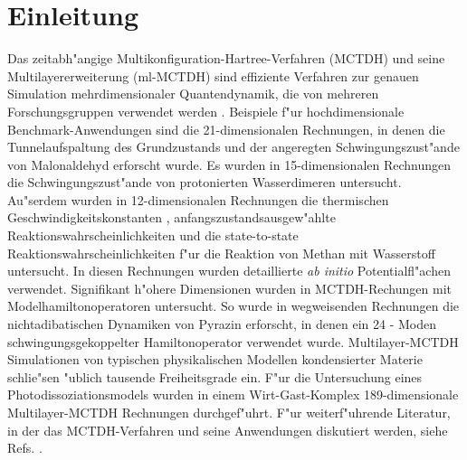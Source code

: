 \chapter{Einleitung}
\label{ch:einleitung}

Das zeitabh"angige Multikonfiguration-Hartree-Verfahren (MCTDH) 
\cite{MMC, MMC1} und seine Multilayererweiterung (ml-MCTDH)
\cite{WT3, Mreview2} 
sind effiziente Verfahren zur genauen Simulation mehrdimensionaler Quantendynamik,
die von mehreren Forschungsgruppen verwendet werden 
\cite{MCTDHex1, WestPNM, MCTDHex2, W1, MCTDHex4, MCTDHex5, MCTDHex6, MCTDHex7, MCTDHex8,
MCTDHex9, MCTDHex10, MCTDHex11, MCTDHex12, MCTDHex13, MCTDHex14, MCTDHex15, MCTDHex16, MCTDHex17,MCTDHex18}. 
Beispiele f"ur hochdimensionale 
Benchmark-Anwendungen sind die 21-dimen\-sio\-nalen Rechnungen, in denen die Tunnelaufspaltung des
Grundzustands \cite{CVM, HCVM, HaM1, MAMCTDH, HaM2, MAMCTDH2} und der angeregten \cite{HCVM, HaM1, MAMCTDH, HaM2, MAMCTDH2}
Schwingungszust"ande von Malonaldehyd erforscht wurde. 
Es wurden in 15-dimen\-sio\-nalen Rechnungen die Schwingungszust"ande von protonierten 
Wasserdi\-meren  \cite{H5O2+MCTDH, H5O2+MCTDH2, H5O2+MCTDH3, H5O2+MCTDH4, H5O2+MCTDH5} untersucht. 
Au"serdem wurden in 12-dimensionalen Rechnungen die thermischen 
Geschwindig\-keitskonstanten \cite{HM1, HM2, WWM, SM, vHNM,NvHM}, anfangszustandsausgew"ahlte Reaktionswahr\-scheinlichkeiten
\cite{SM02, SM04, WeM5, WeM6, WeM8} und die 
state-to-state Reaktionswahrscheinlichkeiten \cite{WeM7} f"ur die Reaktion von Methan mit Wasserstoff 
untersucht. In diesen Rechnungen wurden detaillierte \textit{ab initio} 
Potentialfl"achen verwendet. Signifikant h"ohere Dimensionen wurden in MCTDH-Rechungen mit 
Modelhamiltonoperatoren untersucht. So wurde in wegweisenden Rechnungen  
die nichtadibatischen Dynamiken von Pyrazin erforscht, in denen ein 24 - Moden 
schwingungsgekoppelter Hamiltonoperator \cite{WMC, WMC2, RWMC} verwendet wurde.
Multilayer-MCTDH Simulationen von typischen
physikalischen Modellen \cite{WT3, W1, WST, KCBWT, CTW2, WPHT} kondensierter Materie schlie"sen "ublich tausende Freiheitsgrade ein.
F"ur die Untersuchung eines Photodissoziationsmodels wurden in einem Wirt-Gast-Komplex 189-dimensionale 
Multilayer-MCTDH Rechnungen  durchgef"uhrt\cite{WBRSM}. 
F"ur weiterf"uhrende Literatur, in der das MCTDH-Verfahren und seine Anwendungen diskutiert
werden, siehe Refs. \cite{MCTDHreview, MCTDHreview2, HMreview1, MCTDHbook,Mreview2011, MCTDHreview3}.

